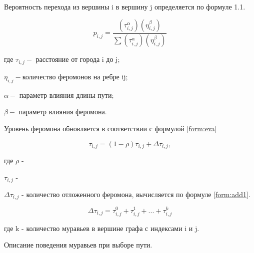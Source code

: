 \documentclass[12pt,a4paper]{report}
\begin{document}
Вероятность перехода из вершины i в вершину j определяется по формуле 1.1.

\begin{equation}\label{form:way}
	p_{i,j}={\frac {(\tau_{i,j}^{\alpha })(\eta_{i,j}^{\beta })}{\sum (\tau_{i,j}^{\alpha })(\eta_{i,j}^{\beta })}}
\end{equation}

где $ \tau_{i,j} - $ расстояние от города i до j;

$\eta_{i,j} - $количество феромонов на ребре ij;

$\alpha - $ параметр влияния длины пути;

$\beta - $ параметр влияния феромона.

Уровень феромона обновляется в соответствии с формулой \ref{form:eva}


\begin{equation}\label{form:eva}
	\tau_{i,j}=(1-\rho )\tau_{i,j}+\Delta \tau_{i,j},
\end{equation}

где $\rho$ - 

$\tau_{i,j}$ - 

$\Delta \tau_{i,j}$ - количество отложенного феромона, вычисляется по формуле \ref{form:add1}.

\begin{equation}\label{form:add1}
	\Delta \tau_{i,j}= \tau_{i,j}^0 + \tau_{i,j}^1 + ... + \tau_{i,j}^k
\end{equation}

где k - количество муравьев в вершине графа с индексами i и j.


Описание поведения муравьев при выборе пути.
\end{document}
